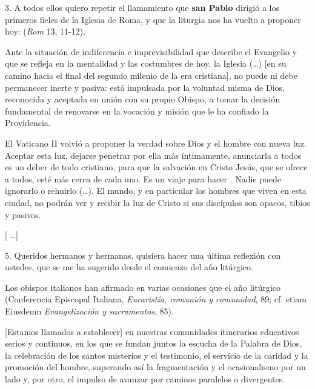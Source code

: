 \begin{body}
	3. A todos ellos quiero repetir el llamamiento que \textbf{san Pablo} dirigió a los primeros fieles de la Iglesia de Roma, y que la liturgia nos ha vuelto a proponer hoy:  (\emph{Rom} 13, 11-12). 
	
	Ante la situación de indiferencia e imprevisibilidad que describe el Evangelio y que se refleja en la mentalidad y las costumbres de hoy, la Iglesia (\ldots{}) {[}en su camino hacia el final del segundo milenio de la era cristiana{]}, no puede ni debe permanecer inerte y pasiva: está impulsada por la voluntad misma de Dios, reconocida y aceptada en unión con su propio Obispo, a tomar la decisión fundamental de renovarse en la vocación y misión que le ha confiado la Providencia. 
	
	El Vaticano II volvió a proponer la verdad sobre Dios y el hombre con nueva luz. Aceptar esta luz, dejarse penetrar por ella más íntimamente, anunciarla a todos es un deber de todo cristiano, para que la salvación en Cristo Jesús, que se ofrece a todos, esté más cerca de cada uno. Es un viaje para hacer . Nadie puede ignorarlo o rehuirlo (\ldots{}). El mundo, y en particular los hombres que viven en esta ciudad, no podrán ver y recibir la luz de Cristo si sus discípulos son opacos, tibios y pasivos. 
	
	{[} \ldots{}{]} 
	
	5. Queridos hermanos y hermanas, quisiera hacer una última reflexión con ustedes, que se me ha sugerido desde el comienzo del año litúrgico.  
	
	Los obispos italianos han afirmado en varias ocasiones que el año litúrgico  (Conferencia Episcopal Italiana, \emph{Eucaristía, comunión y comunidad}, 89; cf. etiam Eiusdemn \emph{Evangelización y sacramentos}, 85). 
	
	{[}Estamos llamados a establecer{]} en nuestras comunidades itinerarios educativos serios y continuos, en los que se fundan juntos la escucha de la Palabra de Dios, la celebración de los santos misterios y el testimonio, el servicio de la caridad y la promoción del hombre, superando así la fragmentación y el ocasionalismo por un lado y, por otro, el impulso de avanzar por caminos paralelos o divergentes. 
	

\end{body}
